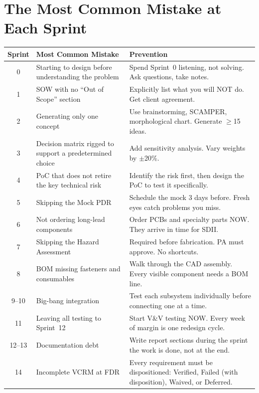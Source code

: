 \section{The Most Common Mistake at Each Sprint}

{\centering\small
\begin{longtable}{c >{\raggedright\arraybackslash}p{4.5cm} >{\raggedright\arraybackslash}p{5.8cm}}
\toprule
\textbf{Sprint} & \textbf{Most Common Mistake} & \textbf{Prevention} \\
\midrule
\endhead
0 & Starting to design before understanding the problem & Spend Sprint~0 listening, not solving. Ask questions, take notes. \\
1 & SOW with no ``Out of Scope'' section & Explicitly list what you will NOT do. Get client agreement. \\
2 & Generating only one concept & Use brainstorming, SCAMPER, morphological chart. Generate $\geq$15 ideas. \\
3 & Decision matrix rigged to support a predetermined choice & Add sensitivity analysis. Vary weights by $\pm$20\%. \\
4 & PoC that does not retire the key technical risk & Identify the risk first, then design the PoC to test it specifically. \\
5 & Skipping the Mock PDR & Schedule the mock 3 days before. Fresh eyes catch problems you miss. \\
6 & Not ordering long-lead components & Order PCBs and specialty parts NOW. They arrive in time for SDII. \\
\midrule
7 & Skipping the Hazard Assessment & Required before fabrication. PA must approve. No shortcuts. \\
8 & BOM missing fasteners and consumables & Walk through the CAD assembly. Every visible component needs a BOM line. \\
9--10 & Big-bang integration & Test each subsystem individually before connecting one at a time. \\
11 & Leaving all testing to Sprint~12 & Start V\&V testing NOW. Every week of margin is one redesign cycle. \\
12--13 & Documentation debt & Write report sections during the sprint the work is done, not at the end. \\
14 & Incomplete VCRM at FDR & Every requirement must be dispositioned: Verified, Failed (with disposition), Waived, or Deferred. \\
\bottomrule
\end{longtable}
}


